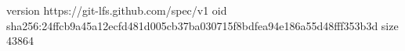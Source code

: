 version https://git-lfs.github.com/spec/v1
oid sha256:24ffcb9a45a12ecfd481d005cb37ba030715f8bdfea94e186a55d48fff353b3d
size 43864
